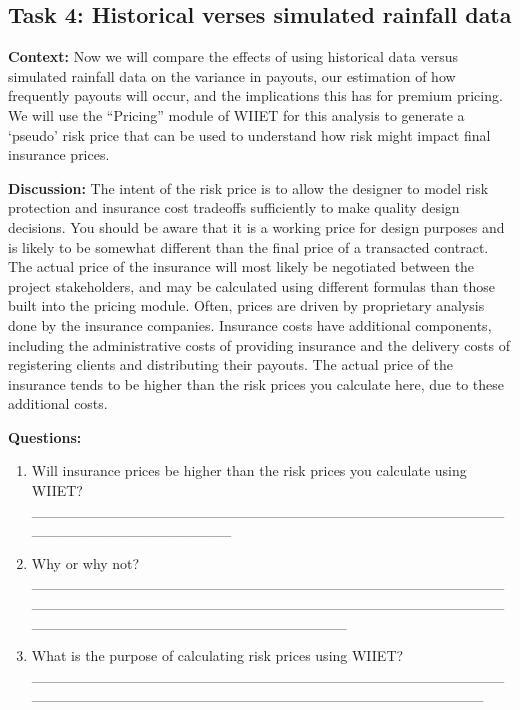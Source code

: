 \documentclass[letterpaper,10pt,english]{sphinxmanual}
\begin{document}
\subsection{Task 4: Historical verses simulated rainfall data}
\label{wiiet/wiiet_influenceshortdatasets_Web:task-4-historical-verses-simulated-rainfall-data}
\textbf{Context:} Now we will compare the effects of using historical data versus simulated rainfall data on the variance in payouts, our estimation of how frequently payouts will occur, and the implications this has for premium pricing. We will use the ``Pricing'' module of WIIET for this analysis to generate a `pseudo' risk price that can be used to understand how risk might impact final insurance prices.

\textbf{Discussion:} The intent of the risk price is to allow the designer to model risk protection and insurance cost tradeoffs sufficiently to make quality design decisions. You should be aware that it is a working price for design purposes and is likely to be somewhat different than the final price of a transacted contract. The actual price of the insurance will most likely be negotiated between the project stakeholders, and may be calculated using different formulas than those built into the pricing module. Often, prices are driven by proprietary analysis done by the insurance companies. Insurance costs have additional components, including the administrative costs of providing insurance and the delivery costs of registering clients and distributing their payouts. The actual price of the insurance tends to be higher than the risk prices you calculate here, due to these additional costs.

\textbf{Questions:}
\begin{enumerate}
\item {} 
Will insurance prices be higher than the risk prices you calculate using WIIET? \_\_\_\_\_\_\_\_\_\_\_\_\_\_\_\_\_\_\_\_\_\_\_\_\_\_\_\_\_\_\_\_\_\_\_\_\_\_\_\_\_\_\_\_\_\_\_\_\_\_\_\_\_\_\_\_\_\_\_\_\_\_\_\_

\item {} 
Why or why not? \_\_\_\_\_\_\_\_\_\_\_\_\_\_\_\_\_\_\_\_\_\_\_\_\_\_\_\_\_\_\_\_\_\_\_\_\_\_\_\_\_\_\_\_\_\_\_\_\_\_\_\_\_\_\_\_\_\_\_\_\_\_\_\_\_\_\_\_\_\_\_\_\_\_\_\_\_\_\_\_\_\_\_\_\_\_\_\_\_\_\_\_\_\_\_\_\_\_\_\_\_\_\_\_\_\_\_\_\_\_\_\_\_\_\_\_\_\_\_\_

\item {} 
What is the purpose of calculating risk prices using WIIET? \_\_\_\_\_\_\_\_\_\_\_\_\_\_\_\_\_\_\_\_\_\_\_\_\_\_\_\_\_\_\_\_\_\_\_\_\_\_\_\_\_\_\_\_\_\_\_\_\_\_\_\_\_\_\_\_\_\_\_\_\_\_\_\_\_\_\_\_\_\_\_\_\_\_\_\_\_\_\_\_\_\_\_\_\_\_\_\_

\end{enumerate}
\end{document}
